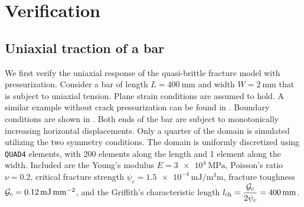\section{Verification}
\label{section brittle/verification}

\subsection{Uniaxial traction of a bar}

We first verify the uniaxial response of the quasi-brittle fracture model with pressurization. Consider a bar of length $L = \SI{400}{\milli\meter}$ and width $W = \SI{2}{\milli\meter}$ that is subject to uniaxial tension. Plane strain conditions are assumed to hold. A similar example without crack pressurization can be found in \cite{JYWu2017}. Boundary conditions are shown in . Both ends of the bar are subject to monotonically increasing horizontal displacements. Only a quarter of the domain is simulated utilizing the two symmetry conditions. The domain is uniformly discretized using \texttt{QUAD4} elements, with 200 elements along the length and 1 element along the width. Included are the Young's modulus $E = \SI{3e4}{\mega\pascal}$, Poisson's ratio $\nu = 0.2$, critical fracture strength $\psi_c = \SI{1.5e-4}{\milli\joule\per\cubic\milli\meter}$, fracture toughness ${\mathcal{G}_c} = \SI{0.12}{\milli\joule\per\square\milli\meter}$, and the Griffith’s characteristic length $l_\text{ch} = \dfrac{{\mathcal{G}_c}}{2\psi_c} = \SI{400}{\milli\meter}$.

